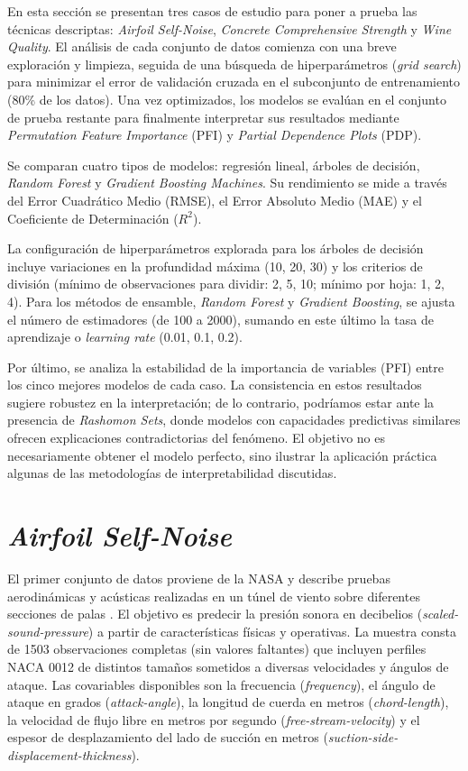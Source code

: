 En esta sección se presentan tres casos de estudio para poner a prueba las técnicas descriptas: \textit{Airfoil Self-Noise}, \textit{Concrete Comprehensive Strength} y \textit{Wine Quality}. El análisis de cada conjunto de datos comienza con una breve exploración y limpieza, seguida de una búsqueda de hiperparámetros (\textit{grid search}) para minimizar el error de validación cruzada en el subconjunto de entrenamiento (80\% de los datos). Una vez optimizados, los modelos se evalúan en el conjunto de prueba restante para finalmente interpretar sus resultados mediante \textit{Permutation Feature Importance} (PFI) y \textit{Partial Dependence Plots} (PDP).

Se comparan cuatro tipos de modelos: regresión lineal, árboles de decisión, \textit{Random Forest} y \textit{Gradient Boosting Machines}. Su rendimiento se mide a través del Error Cuadrático Medio (RMSE), el Error Absoluto Medio (MAE) y el Coeficiente de Determinación ($R^2$).

La configuración de hiperparámetros explorada para los árboles de decisión incluye variaciones en la profundidad máxima (10, 20, 30) y los criterios de división (mínimo de observaciones para dividir: 2, 5, 10; mínimo por hoja: 1, 2, 4). Para los métodos de ensamble, \textit{Random Forest} y \textit{Gradient Boosting}, se ajusta el número de estimadores (de 100 a 2000), sumando en este último la tasa de aprendizaje o \textit{learning rate} (0.01, 0.1, 0.2).

Por último, se analiza la estabilidad de la importancia de variables (PFI) entre los cinco mejores modelos de cada caso. La consistencia en estos resultados sugiere robustez en la interpretación; de lo contrario, podríamos estar ante la presencia de \textit{Rashomon Sets}, donde modelos con capacidades predictivas similares ofrecen explicaciones contradictorias del fenómeno. El objetivo no es necesariamente obtener el modelo perfecto, sino ilustrar la aplicación práctica algunas de las metodologías de interpretabilidad discutidas.

\section{\textit{Airfoil Self-Noise}}

El primer conjunto de datos proviene de la NASA y describe pruebas aerodinámicas y acústicas realizadas en un túnel de viento sobre diferentes secciones de palas \cite{airfoil_self-noise_291}. El objetivo es predecir la presión sonora en decibelios (\textit{scaled-sound-pressure}) a partir de características físicas y operativas. La muestra consta de 1503 observaciones completas (sin valores faltantes) que incluyen perfiles NACA 0012 de distintos tamaños sometidos a diversas velocidades y ángulos de ataque. Las covariables disponibles son la frecuencia (\textit{frequency}), el ángulo de ataque en grados (\textit{attack-angle}), la longitud de cuerda en metros (\textit{chord-length}), la velocidad de flujo libre en metros por segundo (\textit{free-stream-velocity}) y el espesor de desplazamiento del lado de succión en metros (\textit{suction-side-displacement-thickness}).

